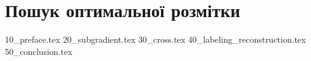 \chapter{Пошук оптимальної розмітки}
{10_preface.tex}
{20_subgradient.tex}
{30_cross.tex}
{40_labeling_reconstruction.tex}
{50_conclusion.tex}